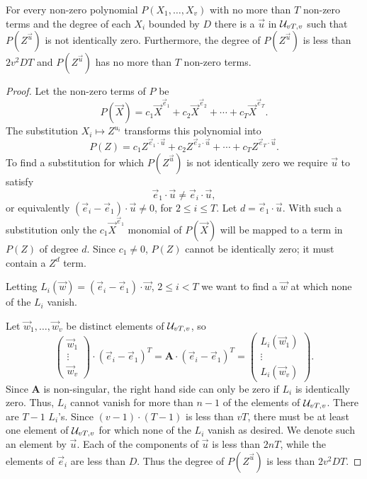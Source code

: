 \begin{proposition}\label{Sparse:ZeroPoly:Prop}
For every non-zero polynomial $P(X_1, \ldots, X_v)$ with no more than
$T$ non-zero terms and the degree of each $X_i$ bounded by $D$ there is a $\vec{u}$ in ${\cal U}_{vT,v}$ such that
$P(Z^{\vec{u}})$ is not identically zero.  Furthermore, the degree of
$P(Z^{\vec{u}})$ is less than $2v^2DT$ and $P(Z^{\vec{u}})$ has no
more than $T$ non-zero terms.
\end{proposition}

\begin{proof}
Let the non-zero terms of $P$ be
\[
P(\vec{X}) = c_1 \vec{X}^{\vec{e}_1} + c_2 \vec{X}^{\vec{e}_2} 
+ \cdots + c_T \vec{X}^{\vec{e}_T}.
\]
The substitution $X_i \mapsto Z^{u_i}$ transforms this polynomial into
\[
P(Z) = c_1 Z^{\vec{e}_1 \cdot \vec{u}} + c_2 Z^{\vec{e}_2 \cdot \vec{u}} +
\cdots +
c_T Z^{\vec{e}_T \cdot \vec{u}}.
\]
To find a substitution for which $P(Z^{\vec{u}})$ is not identically
zero we require $\vec{u}$ to satisfy
\[
\vec{e}_1 \cdot \vec{u} \not= \vec{e}_i \cdot \vec{u},
\]
or equivalently $(\vec{e}_i - \vec{e}_1) \cdot \vec{u} \not= 0$, for $2
\le i \le T$.  Let $d = \vec{e}_1 \cdot \vec{u}$.  With such a
substitution only the $c_1 \vec{X}^{\vec{e}_1}$ monomial of
$P(\vec{X})$ will be mapped to a term in $P(Z)$ of degree $d$.  Since
$c_1 \not= 0$, $P(Z)$ cannot be identically zero; it must contain a
$Z^d$ term.

Letting $L_i(\vec{w}) = (\vec{e}_i - \vec{e}_1)\cdot
\vec{w}$, $2 \le i < T$ we want to find a $\vec{w}$ at which none of
the $L_i$ vanish. 

Let $\vec{w}_1, \ldots, \vec{w}_v$ be distinct elements of ${\cal
U}_{vT, v}$, so
\[
\begin{pmatrix}\vec{w}_1 \\ \vdots \\ \vec{w}_v \end{pmatrix} \cdot
 (\vec{e}_i - \vec{e}_1)^T
 = 
\mathbf{A}\cdot (\vec{e}_i - \vec{e}_1)^T = 
  \begin{pmatrix}L_i(\vec{w}_1) \\ \vdots \\ L_i(\vec{w}_v) \end{pmatrix}.
\]
Since $\mathbf{A}$ is non-singular, the right hand side can only be zero
if $L_i$ is identically zero.  Thus, $L_i$ cannot vanish for more than
$n-1$ of the elements of ${\cal U}_{vT,v}$.  There are $T-1$ $L_i$'s.
Since $(v-1)\cdot (T-1)$ is less than $vT$, there must be at least one
element of ${\cal U}_{vT, v}$ for which none of the $L_i$ vanish as
desired.  We denote such an element by $\vec{u}$.  Each of the
components of $\vec{u}$ is less than $2nT$, while the elements of
$\vec{e}_i$ are less than $D$.  Thus the degree of $P(Z^{\vec{u}})$ is
less than $2v^2DT$.
\end{proof}

